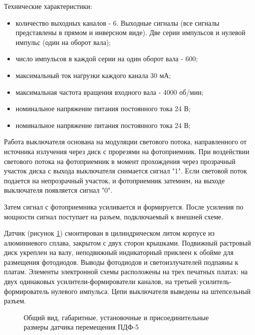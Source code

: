         Технические характеристики: 
        \begin{itemize}
        \item количество выходных каналов - 6. Выходные сигналы (все сигналы
            представлены в прямом и инверсном виде). Две серии импульсов и
            нулевой импульс (один на оборот вала); 
        \item число импульсов в каждой серии на один оборот вала - 600;
        \item максимальный ток нагрузки каждого канала 30 мА;
        \item максимальная частота вращения входного вала - 4000 об/мин;
        \item номинальное напряжение питания постоянного тока 24 В;
        \item номинальное напряжение питания постоянного тока 24 В;
        \end{itemize}

        Работа выключателя основана на модуляции светового потока,
        направленного от источника излучения через диск с прорезями на
        фотоприемник. При воздействии светового потока на фотоприемник в момент
        прохождения через прозрачный участок диска с выхода выключателя
        снимается сигнал "1". Если световой поток подается на непрозрачный
        участок, и фотоприемник затемнен, на выходе выключателя появляется
        сигнал "0".  
        
        Затем сигнал с фотоприемника усиливается и формируется. После усиления
        по мощности сигнал поступает на разъем, подключаемый к внешней схеме. 

        Датчик (рисунок \ref{fig:encoder}) смонтирован в цилиндрическом литом
        корпусе из алюминиевого сплава, закрытом с двух сторон крышками.
        Подвижный растровый диск укреплен на валу, неподвижный индикаторный
        приклеен к обойме для размещения фотодиодов. Выводы фотодиодов и
        светоизлучателей подпаяны к платам. Элементы электронной схемы
        расположены на трех печатных платах: на двух одинаковых
        усилители-формирователи каналов, на третьей усилитель-формирователь
        нулевого импульса. Цепи выключателя выведены на штепсельный разъем.

        \begin{figure}
            \caption{%
                Общий вид, габаритные, установочные и присоединительные размеры
                датчика перемещения ПДФ-5
            }
            \label{fig:encoder}
        \end{figure}
        
